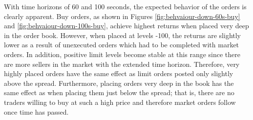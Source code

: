 With time horizons of 60 and 100 seconds, the expected behavior of the orders is clearly apparent.
Buy orders, as shown in Figures \ref{fig:behvaiour-down-60s-buy} and \ref{fig:behvaiour-down-100s-buy}, achieve highest returns when placed very deep in the order book.
However, when placed at levels -100, the returns are slightly lower as a result of unexecuted orders which had to be completed with market orders.
In addition, positive limit levels become stable at this range since there are more sellers in the market with the extended time horizon.  Therefore, very highly placed orders have the same effect as limit orders posted only slightly above the spread.
Furthermore, placing orders very deep in the book has the same effect as when placing them just below the spread; that is, there are no traders willing to buy at such a high price and therefore market orders follow once time has passed.
\vfill
\newpage
